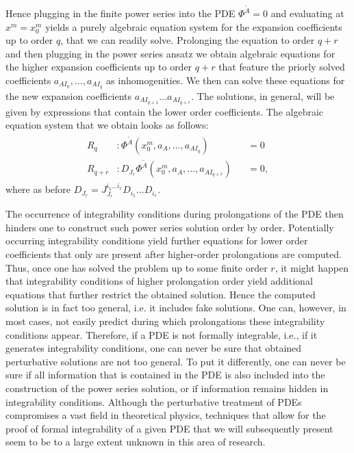 Hence plugging in the finite power series into the PDE $\Phi^{\tilde{A}} =0$ and evaluating at $x^m=x^m_0$ yields a purely algebraic equation system for the expansion coefficients up to order $q$, that we can readily solve. Prolonging the equation to order $q+r$ and then plugging in the power series ansatz we obtain algebraic equations for the higher expansion coefficients up to order $q+r$ that feature the priorly solved coefficients $a_{AI_0},...,a_{AI_q}$ as inhomogenities. We then can solve these equations for the new expansion coefficients $a_{AI_{q+1}}...a_{AI_{q+r}}$. The solutions, in general, will be given by expressions that contain the lower order coefficients.
The algebraic equation system that we obtain looks as follows:
\begin{align}
\begin{aligned}
R_q &: \Phi^{\tilde{A}}(x_0^m,a_A,...,a_{AI_q}) &&= 0 \\
R_{q+r} &:  D_{J_r}\Phi^{\tilde{A}}(x_0^m,a_A,...,a_{AI_{q+r}}) &&= 0,
\end{aligned}
\end{align}
where as before $D_{J_r} = J^{i_1...i_r}_{J_r} D_{i_1} ... D_{i_r}$.

The occurrence of integrability conditions during prolongations of the PDE then hinders one to construct such power series solution order by order. Potentially occurring integrability conditions yield further equations for lower order coefficients that only are present after higher-order prolongations are computed. Thus, once one has solved the problem up to some finite order $r$, it might happen that integrability conditions of higher prolongation order yield additional equations that further restrict the obtained solution. 
Hence the computed solution is in fact too general, i.e. it includes fake solutions.
One can, however, in most cases, not easily predict during which prolongations these integrability conditions appear. Therefore, if a PDE is not formally integrable, i.e., if it generates integrability conditions, one can never be sure that obtained perturbative solutions are not too general. To put it differently, one can never be sure if all information that is contained in the PDE is also included into the construction of the power series solution, or if information remains hidden in integrability conditions.
Although the perturbative treatment of PDEs compromises a vast field in theoretical physics, techniques that allow for the proof of formal integrability of a given PDE that we will subsequently present seem to be to a large extent unknown in this area of research. 

